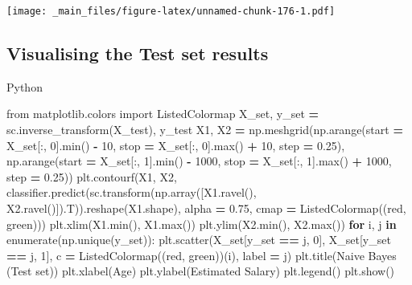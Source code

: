 \documentclass[
]{book}
\newenvironment{Shaded}{\begin{snugshade}}{\end{snugshade}}
\newcommand{\BuiltInTok}[1]{#1}
\newcommand{\ControlFlowTok}[1]{\textcolor[rgb]{0.13,0.29,0.53}{\textbf{#1}}}
\newcommand{\DecValTok}[1]{\textcolor[rgb]{0.00,0.00,0.81}{#1}}
\newcommand{\FloatTok}[1]{\textcolor[rgb]{0.00,0.00,0.81}{#1}}
\newcommand{\ImportTok}[1]{#1}
\newcommand{\KeywordTok}[1]{\textcolor[rgb]{0.13,0.29,0.53}{\textbf{#1}}}
\newcommand{\NormalTok}[1]{#1}
\newcommand{\OperatorTok}[1]{\textcolor[rgb]{0.81,0.36,0.00}{\textbf{#1}}}
\newcommand{\StringTok}[1]{\textcolor[rgb]{0.31,0.60,0.02}{#1}}
\theoremstyle{definition}
\theoremstyle{definition}
\theoremstyle{definition}
\theoremstyle{definition}
\theoremstyle{remark}
\begin{document}
\texttt{[image: \_main\_files/figure-latex/unnamed-chunk-176-1.pdf]}

\hypertarget{visualising-the-test-set-results-5}{%
\subsection{Visualising the Test set results}\label{visualising-the-test-set-results-5}}

Python

\begin{Shaded}
\begin{Highlighting}[]
\ImportTok{from}\NormalTok{ matplotlib.colors }\ImportTok{import}\NormalTok{ ListedColormap}
\NormalTok{X\_set, y\_set }\OperatorTok{=}\NormalTok{ sc.inverse\_transform(X\_test), y\_test}
\NormalTok{X1, X2 }\OperatorTok{=}\NormalTok{ np.meshgrid(np.arange(start }\OperatorTok{=}\NormalTok{ X\_set[:, }\DecValTok{0}\NormalTok{].}\BuiltInTok{min}\NormalTok{() }\OperatorTok{{-}} \DecValTok{10}\NormalTok{, stop }\OperatorTok{=}\NormalTok{ X\_set[:, }\DecValTok{0}\NormalTok{].}\BuiltInTok{max}\NormalTok{() }\OperatorTok{+} \DecValTok{10}\NormalTok{, step }\OperatorTok{=} \FloatTok{0.25}\NormalTok{),}
\NormalTok{                     np.arange(start }\OperatorTok{=}\NormalTok{ X\_set[:, }\DecValTok{1}\NormalTok{].}\BuiltInTok{min}\NormalTok{() }\OperatorTok{{-}} \DecValTok{1000}\NormalTok{, stop }\OperatorTok{=}\NormalTok{ X\_set[:, }\DecValTok{1}\NormalTok{].}\BuiltInTok{max}\NormalTok{() }\OperatorTok{+} \DecValTok{1000}\NormalTok{, step }\OperatorTok{=} \FloatTok{0.25}\NormalTok{))}
\NormalTok{plt.contourf(X1, X2, classifier.predict(sc.transform(np.array([X1.ravel(), X2.ravel()]).T)).reshape(X1.shape),}
\NormalTok{             alpha }\OperatorTok{=} \FloatTok{0.75}\NormalTok{, cmap }\OperatorTok{=}\NormalTok{ ListedColormap((}\StringTok{\textquotesingle{}red\textquotesingle{}}\NormalTok{, }\StringTok{\textquotesingle{}green\textquotesingle{}}\NormalTok{)))}
\NormalTok{plt.xlim(X1.}\BuiltInTok{min}\NormalTok{(), X1.}\BuiltInTok{max}\NormalTok{())}
\NormalTok{plt.ylim(X2.}\BuiltInTok{min}\NormalTok{(), X2.}\BuiltInTok{max}\NormalTok{())}
\ControlFlowTok{for}\NormalTok{ i, j }\KeywordTok{in} \BuiltInTok{enumerate}\NormalTok{(np.unique(y\_set)):}
\NormalTok{    plt.scatter(X\_set[y\_set }\OperatorTok{==}\NormalTok{ j, }\DecValTok{0}\NormalTok{], X\_set[y\_set }\OperatorTok{==}\NormalTok{ j, }\DecValTok{1}\NormalTok{], c }\OperatorTok{=}\NormalTok{ ListedColormap((}\StringTok{\textquotesingle{}red\textquotesingle{}}\NormalTok{, }\StringTok{\textquotesingle{}green\textquotesingle{}}\NormalTok{))(i), label }\OperatorTok{=}\NormalTok{ j)}
\NormalTok{plt.title(}\StringTok{\textquotesingle{}Naive Bayes (Test set)\textquotesingle{}}\NormalTok{)}
\NormalTok{plt.xlabel(}\StringTok{\textquotesingle{}Age\textquotesingle{}}\NormalTok{)}
\NormalTok{plt.ylabel(}\StringTok{\textquotesingle{}Estimated Salary\textquotesingle{}}\NormalTok{)}
\NormalTok{plt.legend()}
\NormalTok{plt.show()}
\end{Highlighting}
\end{Shaded}
\end{document}
